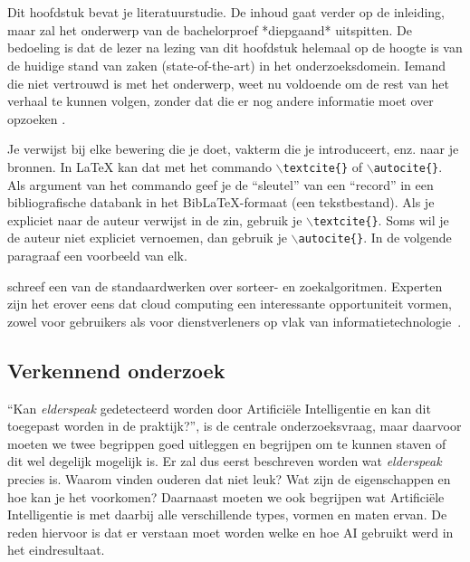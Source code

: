 \chapter{}
\label{ch:stand-van-zaken}




\color{blue}
Dit hoofdstuk bevat je literatuurstudie. De inhoud gaat verder op de inleiding, maar zal het onderwerp van de bachelorproef *diepgaand* uitspitten. De bedoeling is dat de lezer na lezing van dit hoofdstuk helemaal op de hoogte is van de huidige stand van zaken (state-of-the-art) in het onderzoeksdomein. Iemand die niet vertrouwd is met het onderwerp, weet nu voldoende om de rest van het verhaal te kunnen volgen, zonder dat die er nog andere informatie moet over opzoeken \autocite{Pollefliet2011}.

Je verwijst bij elke bewering die je doet, vakterm die je introduceert, enz. naar je bronnen. In \LaTeX{} kan dat met het commando \texttt{$\backslash${textcite\{\}}} of \texttt{$\backslash${autocite\{\}}}. Als argument van het commando geef je de ``sleutel'' van een ``record'' in een bibliografische databank in het Bib\LaTeX{}-formaat (een tekstbestand). Als je expliciet naar de auteur verwijst in de zin, gebruik je \texttt{$\backslash${}textcite\{\}}.
Soms wil je de auteur niet expliciet vernoemen, dan gebruik je \texttt{$\backslash${}autocite\{\}}. In de volgende paragraaf een voorbeeld van elk.

\textcite{Knuth1998} schreef een van de standaardwerken over sorteer- en zoekalgoritmen. Experten zijn het erover eens dat cloud computing een interessante opportuniteit vormen, zowel voor gebruikers als voor dienstverleners op vlak van informatietechnologie~\autocite{Creeger2009}.

\color{black}

\section{Verkennend onderzoek}
\label{sec:verkennend-onderzoek}
``Kan \textit{elderspeak} gedetecteerd worden door Artificiële Intelligentie en kan dit toegepast worden in de praktijk?'', is de centrale onderzoeksvraag, maar daarvoor moeten we twee begrippen goed uitleggen en begrijpen om te kunnen staven of dit wel degelijk mogelijk is.
Er zal dus eerst beschreven worden wat \textit{elderspeak} precies is. Waarom vinden ouderen dat niet leuk? Wat zijn de eigenschappen en hoe kan je het voorkomen?
Daarnaast moeten we ook begrijpen wat Artificiële Intelligentie is met daarbij alle verschillende types, vormen en maten ervan. De reden hiervoor is dat er verstaan moet worden welke en hoe AI gebruikt werd in het eindresultaat.


